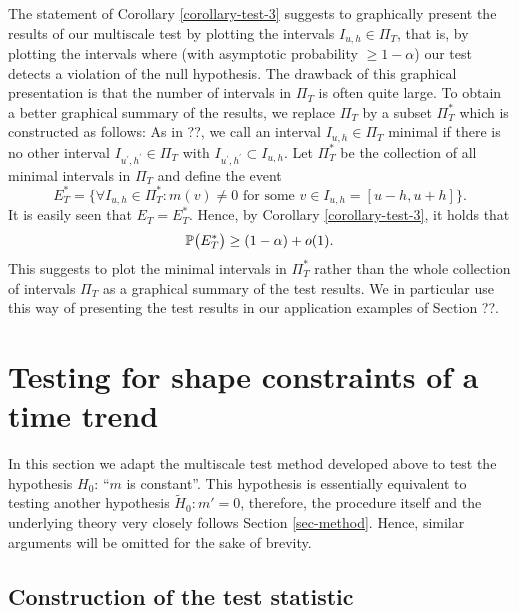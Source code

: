 \documentclass[a4paper,12pt]{article}
\numberwithin{equation}{section}
\begin{document}
The statement of Corollary \ref{corollary-test-3} suggests to graphically present the results of our multiscale test by plotting the intervals $I_{u,h} \in \Pi_T$, that is, by plotting the intervals where (with asymptotic probability $\ge 1-\alpha$) our test detects a violation of the null hypothesis. The drawback of this graphical presentation is that the number of intervals in $\Pi_T$ is often quite large. To obtain a better graphical summary of the results, we replace $\Pi_T$ by a subset $\Pi_T^*$ which is constructed as follows: As in ??, we call an interval $I_{u,h} \in \Pi_T$ minimal if there is no other interval $I_{u^\prime,h^\prime} \in \Pi_T$ with $I_{u^\prime,h^\prime} \subset I_{u,h}$. Let $\Pi_T^*$ be the collection of all minimal intervals in $\Pi_T$ and define the event 
\[ E_T^* = \Big\{ \forall I_{u,h} \in \Pi_T^*: m(v) \ne 0 \text{ for some } v \in I_{u,h} = [u-h,u+h] \Big\}. \]
It is easily seen that $E_T = E_T^*$. Hence, by Corollary \ref{corollary-test-3}, it holds that
\[ \mathbb{P} \big( E_T^* \big) \ge (1-\alpha) + o(1). \] 
This suggests to plot the minimal intervals in $\Pi_T^*$ rather than the whole collection of intervals $\Pi_T$ as a graphical summary of the test results. We in particular use this way of presenting the test results in our application examples of Section ??. 



\newpage
\section{Testing for shape constraints of a time trend}\label{sec-test-shape}

In this section we adapt the multiscale test method developed above %
to test the hypothesis $H_0$: ``$m$ is constant''. This hypothesis is essentially equivalent to testing another hypothesis $\widetilde{H}_0: m'=0$, therefore, the procedure itself and the underlying theory very closely follows Section \ref{sec-method}. Hence, similar arguments will be omitted for the sake of brevity.

\subsection{Construction of the test statistic}\label{subsec-test-shape-stat}
\end{document}

